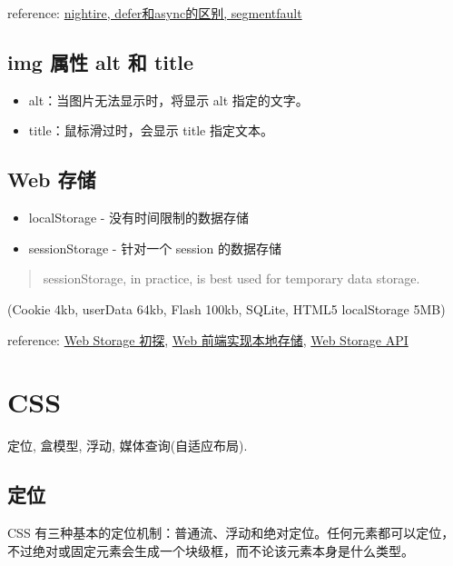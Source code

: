 reference:
\href{http://segmentfault.com/q/1010000000640869/a-1020000000641029}{nightire,
defer和async的区别, segmentfault}

\subsection{img 属性 alt 和
title}\label{img-ux5c5eux6027-alt-ux548c-title}

\begin{itemize}
\tightlist
\item
  alt：当图片无法显示时，将显示 alt 指定的文字。
\item
  title：鼠标滑过时，会显示 title 指定文本。
\end{itemize}

\subsection{Web 存储}\label{web-ux5b58ux50a8}

\begin{itemize}
\tightlist
\item
  localStorage - 没有时间限制的数据存储
\item
  sessionStorage - 针对一个 session 的数据存储
\end{itemize}

\begin{quote}
sessionStorage, in practice, is best used for temporary data storage.
\end{quote}

(Cookie 4kb, userData 64kb, Flash 100kb, SQLite, HTML5 localStorage 5MB)

reference: \href{http://segmentfault.com/a/1190000003936684}{Web Storage
初探}, \href{http://segmentfault.com/a/1190000002701423}{Web
前端实现本地存储},
\href{https://html.spec.whatwg.org/multipage/webstorage.html}{Web
Storage API}

\section{CSS}\label{css}

定位, 盒模型, 浮动, 媒体查询(自适应布局).

\subsection{定位}\label{ux5b9aux4f4d}

CSS
有三种基本的定位机制：普通流、浮动和绝对定位。任何元素都可以定位，不过绝对或固定元素会生成一个块级框，而不论该元素本身是什么类型。


